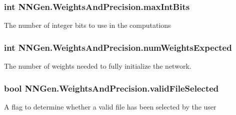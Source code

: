 \subsubsection[{max\+Int\+Bits}]{\setlength{\rightskip}{0pt plus 5cm}int N\+N\+Gen.\+Weights\+And\+Precision.\+max\+Int\+Bits\hspace{0.3cm}{\ttfamily [get]}}\label{class_n_n_gen_1_1_weights_and_precision_a677dd8c72d4d4a7a2b18b292b1a9f6ee}


The number of integer bits to use in the computations 

\hypertarget{class_n_n_gen_1_1_weights_and_precision_a670093e800483388eede4a81440dfb0c}{}
\subsubsection[{num\+Weights\+Expected}]{\setlength{\rightskip}{0pt plus 5cm}int N\+N\+Gen.\+Weights\+And\+Precision.\+num\+Weights\+Expected\hspace{0.3cm}{\ttfamily [get]}}\label{class_n_n_gen_1_1_weights_and_precision_a670093e800483388eede4a81440dfb0c}


The number of weights needed to fully initialize the network. 

\hypertarget{class_n_n_gen_1_1_weights_and_precision_a2dcb1b5045b95f5182ef8e8064931269}{}
\subsubsection[{valid\+File\+Selected}]{\setlength{\rightskip}{0pt plus 5cm}bool N\+N\+Gen.\+Weights\+And\+Precision.\+valid\+File\+Selected\hspace{0.3cm}{\ttfamily [get]}}\label{class_n_n_gen_1_1_weights_and_precision_a2dcb1b5045b95f5182ef8e8064931269}


A flag to determine whether a valid file has been selected by the user 

\hypertarget{class_n_n_gen_1_1_weights_and_precision_afe90c4fc998ce882228b7bf4459cf100}{}

